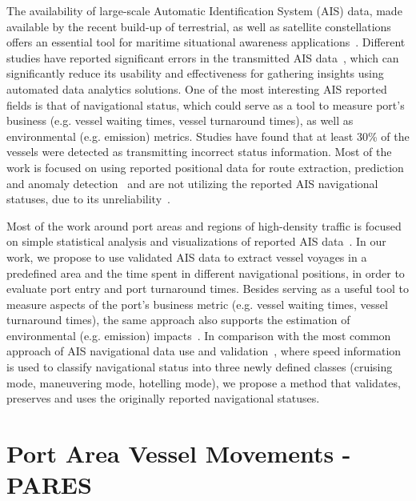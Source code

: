 \documentclass[conference]{IEEEtran}
\begin{document}
The availability of large-scale Automatic Identification System (AIS) data, made available by the recent build-up of terrestrial, as well as satellite constellations offers an essential tool for maritime situational awareness applications~\cite{ais_analysis}. Different studies have reported significant errors in the transmitted AIS data~\cite{AIS_error}, which can significantly reduce its usability and effectiveness for gathering insights using automated data analytics solutions. One of the most interesting AIS reported fields is that of navigational status, which could serve as a tool to measure port's business (e.g. vessel waiting times, vessel turnaround times), as well as environmental (e.g. emission) metrics. Studies have found that at least 30\% of the vessels were detected as transmitting incorrect status information. Most of the work is focused on using reported positional data for route extraction, prediction and anomaly detection~\cite{ais_analysis, ais_anomaly, ais_prediction} and are not utilizing the reported AIS navigational statuses, due to its unreliability~\cite{ais_emissions}.

Most of the work around port areas and regions of high-density traffic is focused on simple statistical analysis and visualizations of reported AIS data~\cite{ais_istanbul, ais_singapore}. In our work, we propose to use validated AIS data to extract vessel voyages in a predefined area and the time spent in different navigational positions, in order to evaluate port entry and port turnaround times. Besides serving as a useful tool to measure aspects of the port's business metric (e.g. vessel waiting times, vessel turnaround times), the same approach also supports the estimation of environmental (e.g. emission) impacts~\cite{ais_emissions}. In comparison with the most common approach of AIS navigational data use and validation~\cite{ais_emissions, ais_emissions2}, where speed information is used to classify navigational status into three newly defined classes (cruising mode, maneuvering mode, hotelling mode), we propose a method that validates, preserves and uses the originally reported navigational statuses.

\section{Port Area Vessel Movements - PARES}
\end{document}
